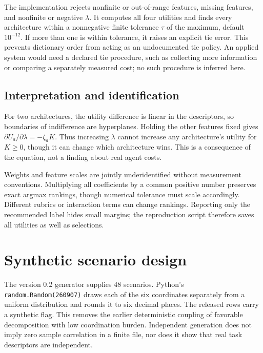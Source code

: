 \documentclass[11pt]{article}
\begin{document}
\begin{table}[htbp]\centering
\caption{Hand-specified coefficients. Values are design hypotheses, not estimated effects.}\label{tab:coefficients}

\end{table}

The implementation rejects nonfinite or out-of-range features, missing features, and nonfinite or negative $\lambda$. It computes all four utilities and finds every architecture within a nonnegative finite tolerance $\tau$ of the maximum, default $10^{-12}$. If more than one is within tolerance, it raises an explicit tie error. This prevents dictionary order from acting as an undocumented tie policy. An applied system would need a declared tie procedure, such as collecting more information or comparing a separately measured cost; no such procedure is inferred here.

\subsection{Interpretation and identification}
For two architectures, the utility difference is linear in the descriptors, so boundaries of indifference are hyperplanes. Holding the other features fixed gives $\partial U_a/\partial\lambda=-\zeta_aK$. Thus increasing $\lambda$ cannot increase any architecture's utility for $K\geq0$, though it can change which architecture wins. This is a consequence of the equation, not a finding about real agent costs.

Weights and feature scales are jointly underidentified without measurement conventions. Multiplying all coefficients by a common positive number preserves exact argmax rankings, though numerical tolerance must scale accordingly. Different rubrics or interaction terms can change rankings. Reporting only the recommended label hides small margins; the reproduction script therefore saves all utilities as well as selections.

\section{Synthetic scenario design}
The version 0.2 generator supplies 48 scenarios. Python's \texttt{random.Random(260907)} draws each of the six coordinates separately from a uniform distribution and rounds it to six decimal places. The released rows carry a synthetic flag. This removes the earlier deterministic coupling of favorable decomposition with low coordination burden. Independent generation does not imply zero sample correlation in a finite file, nor does it show that real task descriptors are independent.
\end{document}

